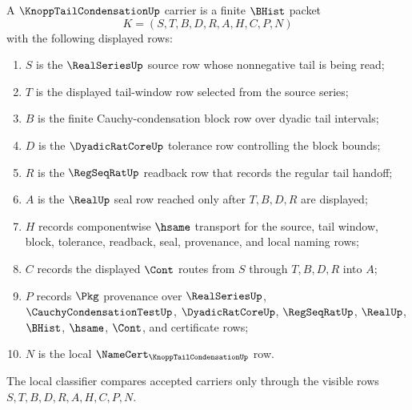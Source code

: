 \begin{definition}
\label{def:knopp-tail-condensation-carrier}
A $\KnoppTailCondensationUp$ carrier is a finite $\BHist$ packet
$$
K=(S,T,B,D,R,A,H,C,P,N)
$$
with the following displayed rows:
\begin{enumerate}
\item $S$ is the $\RealSeriesUp$ source row whose nonnegative tail is being read;
\item $T$ is the displayed tail-window row selected from the source series;
\item $B$ is the finite Cauchy-condensation block row over dyadic tail intervals;
\item $D$ is the $\DyadicRatCoreUp$ tolerance row controlling the block bounds;
\item $R$ is the $\RegSeqRatUp$ readback row that records the regular tail handoff;
\item $A$ is the $\RealUp$ seal row reached only after $T,B,D,R$ are displayed;
\item $H$ records componentwise $\hsame$ transport for the source, tail window, block, tolerance, readback, seal, provenance, and local naming rows;
\item $C$ records the displayed $\Cont$ routes from $S$ through $T,B,D,R$ into $A$;
\item $P$ records $\Pkg$ provenance over $\RealSeriesUp$, $\CauchyCondensationTestUp$, $\DyadicRatCoreUp$, $\RegSeqRatUp$, $\RealUp$, $\BHist$, $\hsame$, $\Cont$, and certificate rows;
\item $N$ is the local $\NameCert_{\KnoppTailCondensationUp}$ row.
\end{enumerate}
The local classifier compares accepted carriers only through the visible rows $S,T,B,D,R,A,H,C,P,N$.
\end{definition}


